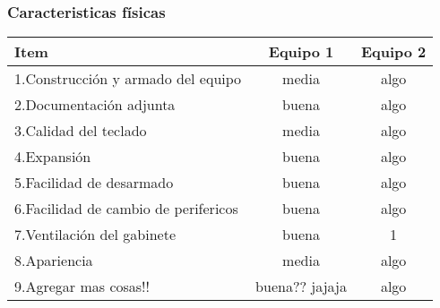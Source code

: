 \subsubsection{Caracteristicas físicas}
\begin{center}
\begin{tabular}{|lcc|} \hline
\footnotesize\textbf{Item} & \footnotesize\textbf{Equipo 1} & \footnotesize\textbf{Equipo 2} \\\hline
1.Construcción y armado del equipo & media & algo \\\hline
2.Documentación adjunta & buena & algo \\\hline
3.Calidad del teclado & media & algo \\\hline
4.Expansión & buena & algo \\\hline
5.Facilidad de desarmado & buena & algo \\\hline
6.Facilidad de cambio de perifericos & buena & algo \\\hline
7.Ventilación del gabinete & buena & 1 \\\hline
8.Apariencia & media & algo \\\hline
9.Agregar mas cosas!! & buena?? jajaja & algo \\\hline
\end{tabular}
\end{center}
